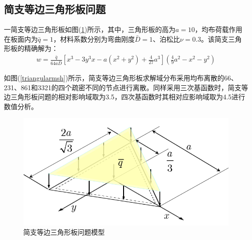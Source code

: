 \subsection{简支等边三角形板问题}
一简支等边三角形板如图(\ref{triangular})所示，其中，三角形板的高为$a=10$，均布荷载作用在板面内为$\bar{q}=1$，材料系数分别为弯曲刚度$\bar{D}=1$、泊松比$\nu=0.3$。该简支三角形板的精确解为：
\begin{equation}
\begin{split}
    w=\frac{\bar q}{64a\bar D}[x^3-3y^3x-a(x^2+y^2)+\frac{4}{27}a^3](\frac{4}{9}a^2-x^2-y^2)
\end{split}
\end{equation}\par
如图(\ref{triangularmsh})所示，简支等边三角形板求解域分布采用均布离散的66、231、861和3321的四个疏密不同的节点进行离散。同样采用三次基函数时，简支等边三角形板问题的相对影响域取为3.5，四次基函数时其相对应影响域取为4.5进行数值分析。\par
\begin{figure}[H]
    \centering
    \includegraphics[scale=0.7]{figure/PHR/T/triangular.png}
    \caption{简支等边三角形板问题模型}\label{triangular}
\end{figure}
